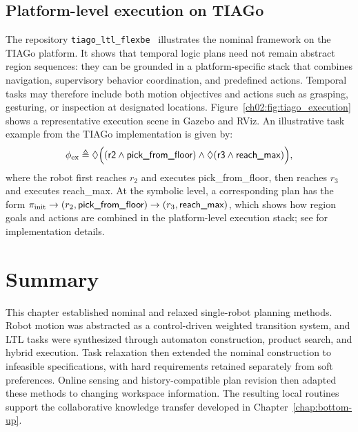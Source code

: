 \subsection{Platform-level execution on TIAGo}
\label{ch02:subsec:tiago_execution}

The repository \texttt{tiago\_ltl\_flexbe}~\citep{guo_tiago_ltl_flexbe}
illustrates the nominal framework on the TIAGo platform. It shows that temporal
logic plans need not remain abstract region sequences: they can be grounded in
a platform-specific stack that combines navigation, supervisory behavior
coordination, and predefined actions. Temporal tasks may therefore include both
motion objectives and actions such as grasping, gesturing, or inspection at
designated locations. Figure~\ref{ch02:fig:tiago_execution} shows a
representative execution scene in Gazebo and RViz.
An illustrative task example from the TIAGo implementation is given by:
\begin{equation}
\phi_{\textup{ex}}
\triangleq
\Diamond\Bigl(
(\textsf{r2} \wedge \textsf{pick\_from\_floor})
\wedge
\Diamond(\textsf{r3} \wedge \textsf{reach\_max})
\Bigr),
\label{ch02:eq:tiago_example}
\end{equation}
where the robot first reaches $r_2$ and executes
\textsf{pick\_from\_floor}, then reaches $r_3$ and executes
\textsf{reach\_max}. At the symbolic level, a corresponding plan has the form
$\pi_{\textup{init}}
\rightarrow
(r_2,\textsf{pick\_from\_floor})
\rightarrow
(r_3,\textsf{reach\_max})$,
which shows how region goals and actions are combined in the platform-level
execution stack; see \citep{guo_tiago_ltl_flexbe} for implementation details.






\section{Summary}
\label{ch02:sec:ch02_summary}


\begin{revision}
This chapter established nominal and relaxed single-robot planning methods.
Robot motion was abstracted as a control-driven weighted transition system,
and LTL tasks were synthesized through automaton construction, product search,
and hybrid execution. Task relaxation then extended the nominal construction
to infeasible specifications, with hard requirements retained separately from
soft preferences. Online sensing and history-compatible plan revision then
adapted these methods to changing workspace information. The resulting local
routines support the collaborative knowledge transfer developed in
Chapter~\ref{chap:bottom-up}.
\end{revision}
